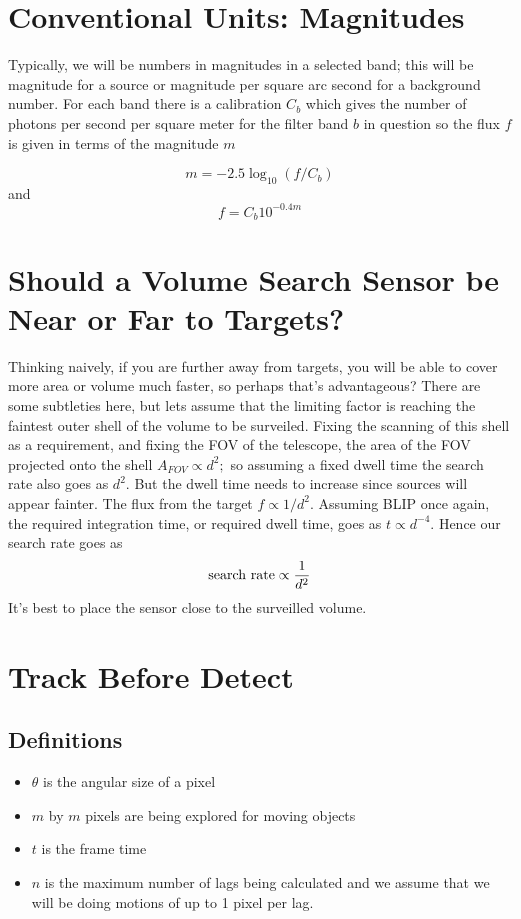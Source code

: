 \documentclass[10pt]{article}
\begin{document}
\section{Conventional Units: Magnitudes}
Typically, we will be numbers in magnitudes in a selected band;
this will be magnitude for a source or magnitude per square arc
second for a background number. 
For each band there is a calibration $C_b$ which gives the number
of photons per second per square meter for the filter band $b$ in 
question so the flux $f$ is given in terms of the magnitude $m$

\begin{equation}
	m = -2.5 \log_{10}(f/C_b)
\end{equation}
and
\begin{equation}
f = C_b 10^{-0.4 m}
\end{equation}

\section{Should a Volume Search Sensor be
Near or Far to Targets?}
Thinking naively, if you are further away
from targets, you will be able to cover more area or volume much faster, so perhaps that's advantageous?   
There are some subtleties here, but lets assume that the limiting factor is reaching the faintest outer shell of the volume to be surveiled.  Fixing the scanning of this shell as a requirement, and fixing the FOV of the telescope, the area of the FOV projected onto the shell 
$ A_{FOV} \propto d^2;$ so assuming a fixed dwell time the search rate also goes as $d^2.$  But the dwell time
needs to increase since sources will appear fainter.
The flux from the target 
$f \propto 1/d^2.$ Assuming BLIP once again, the required
integration time, or required dwell time, goes as $t \propto d^{-4}.$  Hence our search rate goes as 
\begin{equation}
	\mathrm{search\ rate} \propto { 1\over d^2}
\end{equation}
It's best to place the sensor close to the surveilled volume.

\section{Track Before Detect}
\subsection{Definitions}
\begin{itemize}
	\item $\theta$ is the angular size of a pixel
	\item $m$ by $m$ pixels are being explored for moving objects
	\item $t$ is the frame time
	\item $n$ is the maximum number of lags being calculated
	and we assume that we will be doing motions of up to
	1 pixel per lag.
\end{itemize}
\end{document}
